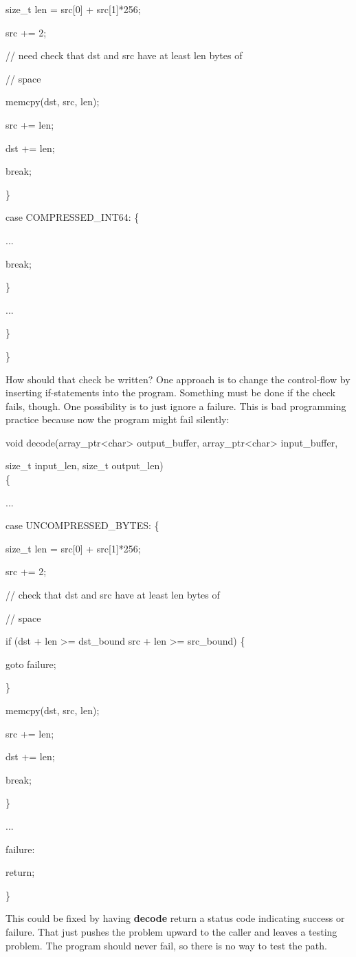 \documentclass[]{article}
\begin{document}
size\_t len = src{[}0{]} + src{[}1{]}*256;

src += 2;

// need check that dst and src have at least len bytes of

// space

memcpy(dst, src, len);

src += len;

dst += len;

break;

\}

case COMPRESSED\_INT64: \{

...

break;

\}

...

\}

\}

How should that check be written? One approach is to change the
control-flow by inserting if-statements into the program. Something must
be done if the check fails, though. One possibility is to just ignore a
failure. This is bad programming practice because now the program might
fail silently:

void decode(array\_ptr\textless{}char\textgreater{} output\_buffer,
array\_ptr\textless{}char\textgreater{} input\_buffer,

size\_t input\_len, size\_t output\_len)\\
\{

...

case UNCOMPRESSED\_BYTES: \{

size\_t len = src{[}0{]} + src{[}1{]}*256;

src += 2;

// check that dst and src have at least len bytes of

// space

if (dst + len \textgreater{}= dst\_bound \textbar{}\textbar{} src + len
\textgreater{}= src\_bound) \{

goto failure;

\}

memcpy(dst, src, len);

src += len;

dst += len;

break;

\}

...

failure:

return;

\}

This could be fixed by having \textbf{decode} return a status code
indicating success or failure. That just pushes the problem upward to
the caller and leaves a testing problem. The program should never fail,
so there is no way to test the path.
\end{document}
